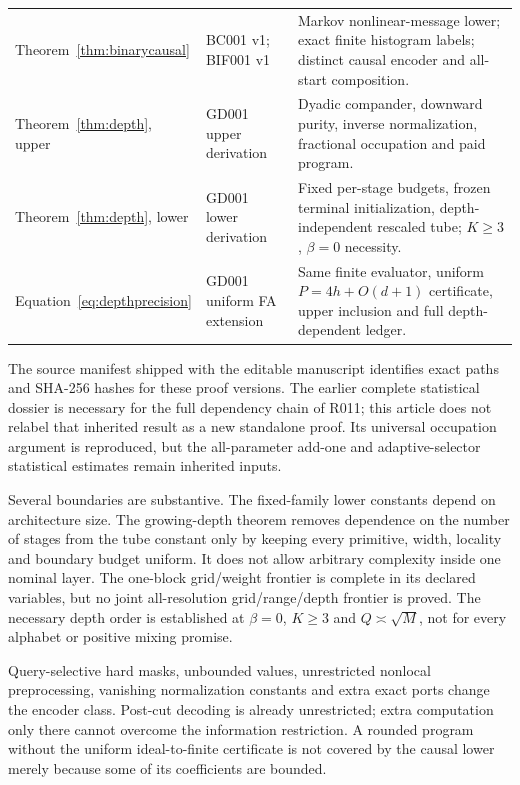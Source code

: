 \documentclass[11pt,letterpaper]{article}
\theoremstyle{definition}\newtheorem{definition}[theorem]{Definition}
\theoremstyle{remark}\newtheorem{remark}[theorem]{Remark}
\newcommand{\unit}[1]{\textsf{#1}}
\begin{document}
\begin{center}
\begin{longtable}{@{}>{\raggedright\arraybackslash}p{}>{\raggedright\arraybackslash}p{}>{\raggedright\arraybackslash}p{}@{}}
Theorem~\ref{thm:binarycausal} & \unit{BC001 v1}; \unit{BIF001 v1} & Markov nonlinear-message lower; exact finite histogram labels; distinct causal encoder and all-start composition.\\[4pt]
Theorem~\ref{thm:depth}, upper & \unit{GD001} upper derivation & Dyadic compander, downward purity, inverse normalization, fractional occupation and paid program.\\[4pt]
Theorem~\ref{thm:depth}, lower & \unit{GD001} lower derivation & Fixed per-stage budgets, frozen terminal initialization, depth-independent rescaled tube; $K\ge3$, $\beta=0$ necessity.\\[4pt]
Equation~\eqref{eq:depthprecision} & \unit{GD001} uniform FA extension & Same finite evaluator, uniform $P=4h+O(d+1)$ certificate, upper inclusion and full depth-dependent ledger.\\

\bottomrule
\end{longtable}
\end{center}

The source manifest shipped with the editable manuscript identifies exact paths and SHA-256 hashes for these proof versions. The earlier complete statistical dossier is necessary for the full dependency chain of \unit{R011}; this article does not relabel that inherited result as a new standalone proof. Its universal occupation argument is reproduced, but the all-parameter add-one and adaptive-selector statistical estimates remain inherited inputs.

Several boundaries are substantive. The fixed-family lower constants depend on architecture size. The growing-depth theorem removes dependence on the number of stages from the tube constant only by keeping every primitive, width, locality and boundary budget uniform. It does not allow arbitrary complexity inside one nominal layer. The one-block grid/weight frontier is complete in its declared variables, but no joint all-resolution grid/range/depth frontier is proved. The necessary depth order is established at $\beta=0$, $K\ge3$ and $Q\asymp\sqrt M$, not for every alphabet or positive mixing promise.

Query-selective hard masks, unbounded values, unrestricted nonlocal preprocessing, vanishing normalization constants and extra exact ports change the encoder class. Post-cut decoding is already unrestricted; extra computation only there cannot overcome the information restriction. A rounded program without the uniform ideal-to-finite certificate is not covered by the causal lower merely because some of its coefficients are bounded.
\end{document}
